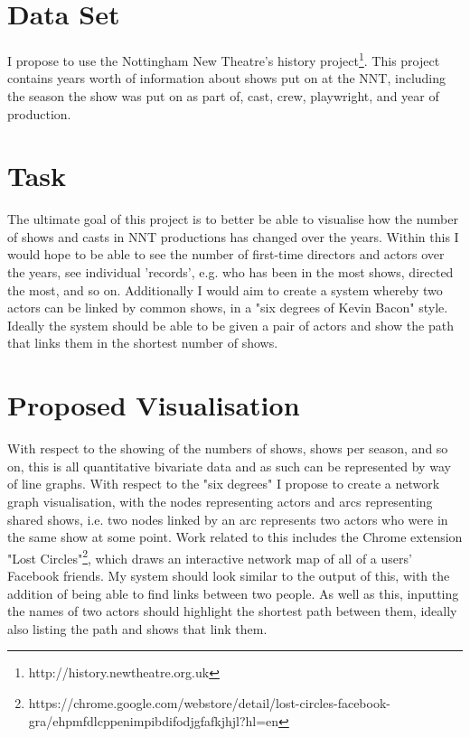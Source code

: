 \documentclass[12pt]{article}
\begin{document}
\maketitle

\section{Data Set}
I propose to use the Nottingham New Theatre's history project\footnote{http://history.newtheatre.org.uk}. 
This project contains years worth of information about shows put on at the NNT, including the season the show was put on as part of, cast, crew, playwright, and year of production. 

\section{Task}
The ultimate goal of this project is to better be able to visualise how the number of shows and casts in NNT productions has changed over the years. 
Within this I would hope to be able to see the number of first-time directors and actors over the years, see individual 'records', e.g. who has been in the most shows, directed the most, and so on. 
Additionally I would aim to create a system whereby two actors can be linked by common shows, in a "six degrees of Kevin Bacon" style. 
Ideally the system should be able to be given a pair of actors and show the path that links them in the shortest number of shows.

\section{Proposed Visualisation}
With respect to the showing of the numbers of shows, shows per season, and so on, this is all quantitative bivariate data and as such can be represented by way of line graphs. 
With respect to the "six degrees" I propose to create a network graph visualisation, with the nodes representing actors and arcs representing shared shows, i.e. two nodes linked by an arc represents two actors who were in the same show at some point. 
Work related to this includes the Chrome extension "Lost Circles"\footnote{https://chrome.google.com/webstore/detail/lost-circles-facebook-gra/ehpmfdlcppenimpibdifodjgfafkjhjl?hl=en}, which draws an interactive network map of all of a users' Facebook friends. 
My system should look similar to the output of this, with the addition of being able to find links between two people. 
As well as this, inputting the names of two actors should highlight the shortest path between them, ideally also listing the path and shows that link them.
\end{document}
